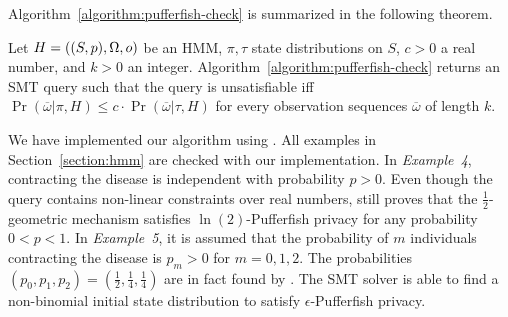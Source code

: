 Algorithm~\ref{algorithm:pufferfish-check} is summarized in the
following theorem. 

\begin{theorem}
  Let $H = ((S, p), \Omega, o)$ be an HMM, $\pi, \tau$ state
  distributions on $S$, $c > 0$ a real number, and $k > 0$ an
  integer. Algorithm~\ref{algorithm:pufferfish-check} returns an SMT
  query such that the query is unsatisfiable iff
  $\Pr (\overline{\omega} | \pi, H) \leq c \cdot
  \Pr (\overline{\omega} | \tau, H)$ for every observation
  sequences $\overline{\omega}$ of length $k$.
\end{theorem}


We have implemented our algorithm using \zpython. All examples in
Section~\ref{section:hmm} are checked with our implementation. In
\textit{Example~4}, contracting the disease is independent with
probability $p > 0$. Even though the query contains non-linear
constraints over real numbers, \zpython still proves that the
$\frac{1}{2}$-geometric mechanism satisfies $\ln(2)$-Pufferfish
privacy for any probability $0 < p < 1$. In \textit{Example~5}, it is
assumed that the probability of $m$ individuals contracting the
disease is $p_m > 0$ for $m = 0, 1, 2$. The probabilities $(p_0, p_1,
p_2) = (\frac{1}{2}, \frac{1}{4}, \frac{1}{4})$ are in fact found by
\zpython. The SMT solver is able to find a non-binomial initial state
distribution to satisfy $\epsilon$-Pufferfish privacy. 
